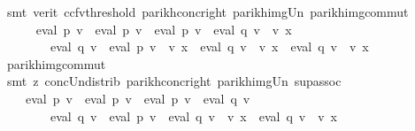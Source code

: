\begin{isabellebody}
\ {\isacharparenleft}{\kern0pt}smt\ {\isacharparenleft}{\kern0pt}verit{\isacharcomma}{\kern0pt}\ ccfv{\isacharunderscore}{\kern0pt}threshold{\isacharparenright}{\kern0pt}\ parikh{\isacharunderscore}{\kern0pt}conc{\isacharunderscore}{\kern0pt}right\ parikh{\isacharunderscore}{\kern0pt}img{\isacharunderscore}{\kern0pt}Un\ parikh{\isacharunderscore}{\kern0pt}img{\isacharunderscore}{\kern0pt}commut{\isacharparenright}{\kern0pt}\isanewline
\ \ \ \ \isamarkupfalse%
\ \isamarkupfalse%
\ {\isachardoublequoteopen}{\isasymdots}\ {\isacharequal}{\kern0pt}\ {\isasymPsi}\ {\isacharparenleft}{\kern0pt}eval\ p{}\ v\ {\isacharat}{\kern0pt}{\isacharat}{\kern0pt}\ eval\ p{}\ v\ {\isasymunion}\ {\isacharparenleft}{\kern0pt}eval\ p{}\ v\ {\isacharat}{\kern0pt}{\isacharat}{\kern0pt}\ eval\ q{}\ v\ {\isacharat}{\kern0pt}{\isacharat}{\kern0pt}\ v\ x\ {\isasymunion}\isanewline
\ \ \ \ \ \ \ \ eval\ q{}\ v\ {\isacharat}{\kern0pt}{\isacharat}{\kern0pt}\ eval\ p{}\ v\ {\isacharat}{\kern0pt}{\isacharat}{\kern0pt}\ v\ x\ {\isasymunion}\ eval\ q{}\ v\ {\isacharat}{\kern0pt}{\isacharat}{\kern0pt}\ v\ x\ {\isacharat}{\kern0pt}{\isacharat}{\kern0pt}\ eval\ q{}\ v\ {\isacharat}{\kern0pt}{\isacharat}{\kern0pt}\ v\ x{\isacharparenright}{\kern0pt}{\isacharparenright}{\kern0pt}{\isachardoublequoteclose}\isanewline
\ \ \ \ \ \ \isamarkupfalse%
\ parikh{\isacharunderscore}{\kern0pt}img{\isacharunderscore}{\kern0pt}commut\ \isamarkupfalse%
\ {\isacharparenleft}{\kern0pt}smt\ {\isacharparenleft}{\kern0pt}z{}{\isacharparenright}{\kern0pt}\ conc{\isacharunderscore}{\kern0pt}Un{\isacharunderscore}{\kern0pt}distrib{\isacharparenleft}{\kern0pt}{}{\isacharparenright}{\kern0pt}\ parikh{\isacharunderscore}{\kern0pt}conc{\isacharunderscore}{\kern0pt}right\ parikh{\isacharunderscore}{\kern0pt}img{\isacharunderscore}{\kern0pt}Un\ sup{\isacharunderscore}{\kern0pt}assoc{\isacharparenright}{\kern0pt}\isanewline
\ \ \ \ \isamarkupfalse%
\ \isamarkupfalse%
\ {\isachardoublequoteopen}{\isasymdots}\ {\isacharequal}{\kern0pt}\ {\isasymPsi}\ {\isacharparenleft}{\kern0pt}eval\ p{}\ v\ {\isacharat}{\kern0pt}{\isacharat}{\kern0pt}\ eval\ p{}\ v\ {\isasymunion}\ {\isacharparenleft}{\kern0pt}eval\ p{}\ v\ {\isacharat}{\kern0pt}{\isacharat}{\kern0pt}\ eval\ q{}\ v\ {\isasymunion}\isanewline
\ \ \ \ \ \ \ \ eval\ q{}\ v\ {\isacharat}{\kern0pt}{\isacharat}{\kern0pt}\ eval\ p{}\ v\ {\isasymunion}\ eval\ q{}\ v\ {\isacharat}{\kern0pt}{\isacharat}{\kern0pt}\ v\ x\ {\isacharat}{\kern0pt}{\isacharat}{\kern0pt}\ eval\ q{}\ v{\isacharparenright}{\kern0pt}\ {\isacharat}{\kern0pt}{\isacharat}{\kern0pt}\ v\ x{\isacharparenright}{\kern0pt}{\isachardoublequoteclose}\isanewline

\end{isabellebody}
